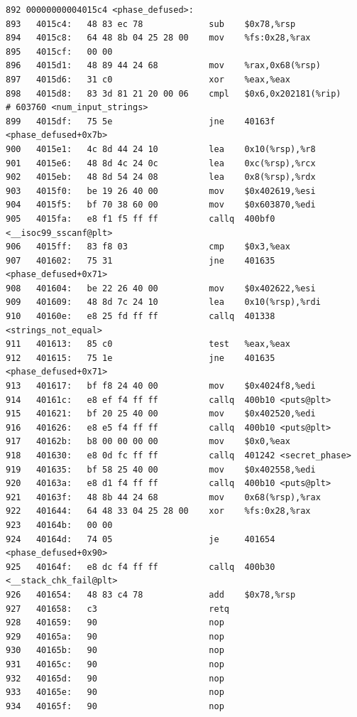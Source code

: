 \documentclass{article}
\begin{document}
\begin{lstlisting}[title = phase\_defused对应的反汇编代码, xleftmargin = 0.5em,xrightmargin = 0.5em, aboveskip = 1em, numbers = none, basicstyle=\footnotesize\ttfamily]
892 00000000004015c4 <phase_defused>:
893   4015c4:   48 83 ec 78             sub    $0x78,%rsp
894   4015c8:   64 48 8b 04 25 28 00    mov    %fs:0x28,%rax
895   4015cf:   00 00
896   4015d1:   48 89 44 24 68          mov    %rax,0x68(%rsp)
897   4015d6:   31 c0                   xor    %eax,%eax
898   4015d8:   83 3d 81 21 20 00 06    cmpl   $0x6,0x202181(%rip)        # 603760 <num_input_strings>
899   4015df:   75 5e                   jne    40163f <phase_defused+0x7b>
900   4015e1:   4c 8d 44 24 10          lea    0x10(%rsp),%r8
901   4015e6:   48 8d 4c 24 0c          lea    0xc(%rsp),%rcx
902   4015eb:   48 8d 54 24 08          lea    0x8(%rsp),%rdx
903   4015f0:   be 19 26 40 00          mov    $0x402619,%esi
904   4015f5:   bf 70 38 60 00          mov    $0x603870,%edi
905   4015fa:   e8 f1 f5 ff ff          callq  400bf0 <__isoc99_sscanf@plt>
906   4015ff:   83 f8 03                cmp    $0x3,%eax
907   401602:   75 31                   jne    401635 <phase_defused+0x71>
908   401604:   be 22 26 40 00          mov    $0x402622,%esi
909   401609:   48 8d 7c 24 10          lea    0x10(%rsp),%rdi
910   40160e:   e8 25 fd ff ff          callq  401338 <strings_not_equal>
911   401613:   85 c0                   test   %eax,%eax
912   401615:   75 1e                   jne    401635 <phase_defused+0x71>
913   401617:   bf f8 24 40 00          mov    $0x4024f8,%edi
914   40161c:   e8 ef f4 ff ff          callq  400b10 <puts@plt>
915   401621:   bf 20 25 40 00          mov    $0x402520,%edi
916   401626:   e8 e5 f4 ff ff          callq  400b10 <puts@plt>
917   40162b:   b8 00 00 00 00          mov    $0x0,%eax
918   401630:   e8 0d fc ff ff          callq  401242 <secret_phase>                                           
919   401635:   bf 58 25 40 00          mov    $0x402558,%edi
920   40163a:   e8 d1 f4 ff ff          callq  400b10 <puts@plt>
921   40163f:   48 8b 44 24 68          mov    0x68(%rsp),%rax
922   401644:   64 48 33 04 25 28 00    xor    %fs:0x28,%rax
923   40164b:   00 00
924   40164d:   74 05                   je     401654 <phase_defused+0x90>
925   40164f:   e8 dc f4 ff ff          callq  400b30 <__stack_chk_fail@plt>
926   401654:   48 83 c4 78             add    $0x78,%rsp
927   401658:   c3                      retq
928   401659:   90                      nop
929   40165a:   90                      nop
930   40165b:   90                      nop
931   40165c:   90                      nop
932   40165d:   90                      nop
933   40165e:   90                      nop
934   40165f:   90                      nop
  \end{lstlisting}
\end{document}
